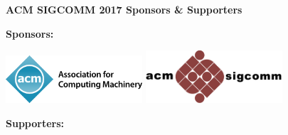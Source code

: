 \documentclass[12pt]{article}
\begin{document}
\begin{center}
\Large\textbf{ACM SIGCOMM 2017 Sponsors \& Supporters}
\end{center}

\textbf{Sponsors:}

\begin{center}
  \includegraphics[width=2in]{acm.png}
  \hspace{1in}
  \includegraphics[width=2in]{sig.png}
\end{center}

\textbf{Supporters:}
\end{document}
